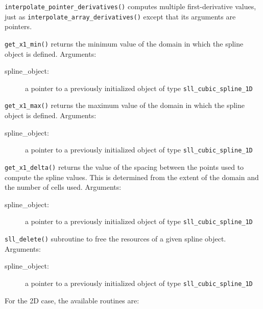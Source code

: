 \documentclass[]{report}   %
\begin{document}
\begin{description}
	\item \verb+interpolate_pointer_derivatives()+ computes multiple first-derivative values, just as \verb+interpolate_array_derivatives()+ except that its arguments are pointers.
	
	\item \verb+get_x1_min()+ returns the minimum value of the domain in which the spline object is defined. Arguments:
		\begin{description}
			\item[spline\_object:] a pointer to a previously initialized object of type \verb+sll_cubic_spline_1D+
		\end{description}
	
	\item \verb+get_x1_max()+ returns the maximum value of the domain in which the spline object is defined. Arguments:
		\begin{description}
			\item[spline\_object:] a pointer to a previously initialized object of type \verb+sll_cubic_spline_1D+
		\end{description}
		
		\item \verb+get_x1_delta()+ returns the value of the spacing between the points used to compute the spline values. This is determined from the extent of the domain and the number of cells used. Arguments:
		\begin{description}
			\item[spline\_object:] a pointer to a previously initialized object of type \verb+sll_cubic_spline_1D+
		\end{description}

	\item \verb+sll_delete()+ subroutine to free the resources of a given spline object. Arguments:
		\begin{description}
			\item[spline\_object:] a pointer to a previously initialized object of type \verb+sll_cubic_spline_1D+
		\end{description}
\end{description}



For the 2D case, the available routines are:
\end{document}

